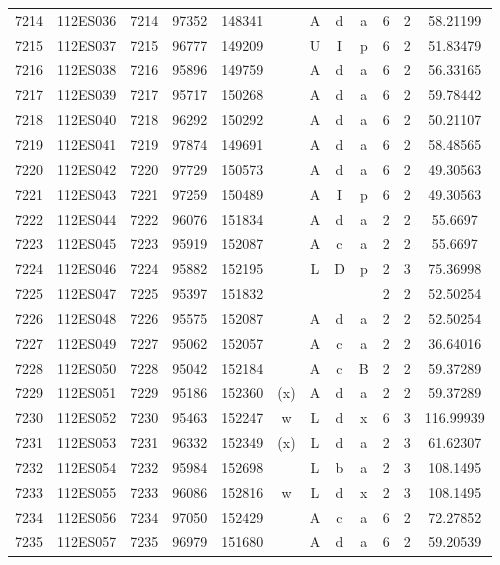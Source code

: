 \begin{tabular}{|*{12}{c|}}
7214 & 112ES036 & 7214 & 97352 & 148341 &  & A & d & a & 6 & 2 & 58.21199 \\ 
7215 & 112ES037 & 7215 & 96777 & 149209 &  & U & I & p & 6 & 2 & 51.83479 \\ 
7216 & 112ES038 & 7216 & 95896 & 149759 &  & A & d & a & 6 & 2 & 56.33165 \\ 
7217 & 112ES039 & 7217 & 95717 & 150268 &  & A & d & a & 6 & 2 & 59.78442 \\ 
7218 & 112ES040 & 7218 & 96292 & 150292 &  & A & d & a & 6 & 2 & 50.21107 \\ 
7219 & 112ES041 & 7219 & 97874 & 149691 &  & A & d & a & 6 & 2 & 58.48565 \\ 
7220 & 112ES042 & 7220 & 97729 & 150573 &  & A & d & a & 6 & 2 & 49.30563 \\ 
7221 & 112ES043 & 7221 & 97259 & 150489 &  & A & I & p & 6 & 2 & 49.30563 \\ 
7222 & 112ES044 & 7222 & 96076 & 151834 &  & A & d & a & 2 & 2 & 55.6697 \\ 
7223 & 112ES045 & 7223 & 95919 & 152087 &  & A & c & a & 2 & 2 & 55.6697 \\ 
7224 & 112ES046 & 7224 & 95882 & 152195 &  & L & D & p & 2 & 3 & 75.36998 \\ 
7225 & 112ES047 & 7225 & 95397 & 151832 &  &  &  &  & 2 & 2 & 52.50254 \\ 
7226 & 112ES048 & 7226 & 95575 & 152087 &  & A & d & a & 2 & 2 & 52.50254 \\ 
7227 & 112ES049 & 7227 & 95062 & 152057 &  & A & c & a & 2 & 2 & 36.64016 \\ 
7228 & 112ES050 & 7228 & 95042 & 152184 &  & A & c & B & 2 & 2 & 59.37289 \\ 
7229 & 112ES051 & 7229 & 95186 & 152360 & (x) & A & d & a & 2 & 2 & 59.37289 \\ 
7230 & 112ES052 & 7230 & 95463 & 152247 & w & L & d & x & 6 & 3 & 116.99939 \\ 
7231 & 112ES053 & 7231 & 96332 & 152349 & (x) & L & d & a & 2 & 3 & 61.62307 \\ 
7232 & 112ES054 & 7232 & 95984 & 152698 &  & L & b & a & 2 & 3 & 108.1495 \\ 
7233 & 112ES055 & 7233 & 96086 & 152816 & w & L & d & x & 2 & 3 & 108.1495 \\ 
7234 & 112ES056 & 7234 & 97050 & 152429 &  & A & c & a & 6 & 2 & 72.27852 \\ 
7235 & 112ES057 & 7235 & 96979 & 151680 &  & A & d & a & 6 & 2 & 59.20539 \\ 

\end{tabular}
